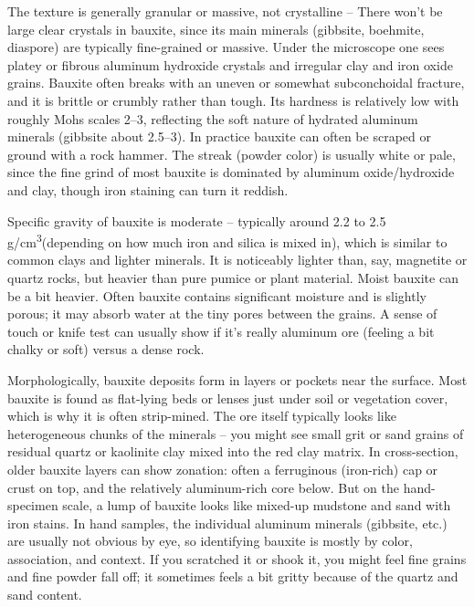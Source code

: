 \documentclass[12pt,a4paper, top=1.9cm, bottom=2.03cm, left=3.81cm, right=1.9cm]{article}
\begin{document}
\noindent\fontsize{12}{14}\selectfont The texture is generally granular or massive, not crystalline – There won’t be large clear crystals in bauxite, since its main minerals (gibbsite, boehmite, diaspore) are typically fine-grained or massive. Under the microscope one sees platey or fibrous aluminum hydroxide crystals and irregular clay and iron oxide grains. Bauxite often breaks with an uneven or somewhat subconchoidal fracture, and it is brittle or crumbly rather than tough. Its hardness is relatively low with roughly Mohs scales 2–3, reflecting the soft nature of hydrated aluminum minerals (gibbsite about 2.5–3). In practice bauxite can often be scraped or ground with a rock hammer. The streak (powder color) is usually white or pale, since the fine grind of most bauxite is dominated by aluminum oxide/hydroxide and clay, though iron staining can turn it reddish.

\noindent\fontsize{12}{14}\selectfont Specific gravity of bauxite is moderate – typically around 2.2 to 2.5 g/cm\textsuperscript{3}(depending on how much iron and silica is mixed in), which is similar to common clays and lighter minerals. It is noticeably lighter than, say, magnetite or quartz rocks, but heavier than pure pumice or plant material. Moist bauxite can be a bit heavier. Often bauxite contains significant moisture and is slightly porous; it may absorb water at the tiny pores between the grains. A sense of touch or knife test can usually show if it’s really aluminum ore (feeling a bit chalky or soft) versus a dense rock.
 
\noindent\fontsize{12}{14}\selectfont Morphologically, bauxite deposits form in layers or pockets near the surface. Most bauxite is found as flat-lying beds or lenses just under soil or vegetation cover, which is why it is often strip-mined. The ore itself typically looks like heterogeneous chunks of the minerals – you might see small grit or sand grains of residual quartz or kaolinite clay mixed into the red clay matrix. In cross-section, older bauxite layers can show zonation: often a ferruginous (iron-rich) cap or crust on top, and the relatively aluminum-rich core below. But on the hand-specimen scale, a lump of bauxite looks like mixed-up mudstone and sand with iron stains. In hand samples, the individual aluminum minerals (gibbsite, etc.) are usually not obvious by eye, so identifying bauxite is mostly by color, association, and context. If you scratched it or shook it, you might feel fine grains and fine powder fall off; it sometimes feels a bit gritty because of the quartz and sand content.
\end{document}
